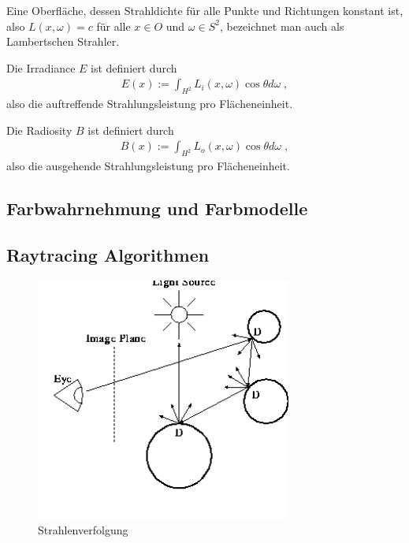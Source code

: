 \begin{Definition}
Eine Oberfläche, dessen Strahldichte für alle Punkte und Richtungen konstant ist, also
$L(x, \omega) = c$  für alle $x \in O$ und $\omega \in S^2$, bezeichnet man auch als Lambertschen Strahler. 
\end{Definition}

\begin{Definition}
Die Irradiance $E$ ist definiert durch
\begin{align}
E(x) := \int_{H^2} L_i(x, \omega) \cos{\theta} d\omega \; ,
\end{align}
also die auftreffende Strahlungsleistung pro Flächeneinheit. 
\end{Definition}

\begin{Definition}
Die Radiosity $B$ ist definiert durch
\begin{align}
B(x) := \int_{H^2} L_o(x, \omega) \cos{\theta} d\omega \; ,
\end{align}
also die ausgehende Strahlungsleistung pro Flächeneinheit. 
\end{Definition}




\subsection{Farbwahrnehmung und Farbmodelle}
\subsection{Raytracing Algorithmen}
 \begin{figure}[H]
    \centering
    \includegraphics[width=0.75\textwidth]{images/rayTracing.png}
    \caption{Strahlenverfolgung}
    \label{fig:diffus}
\end{figure}


